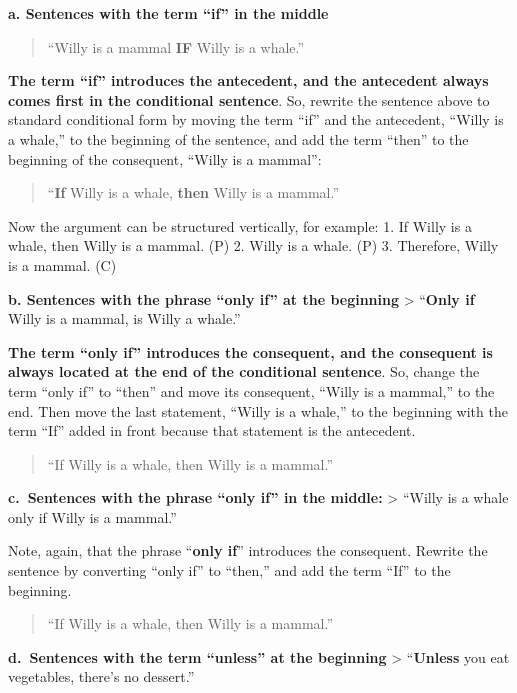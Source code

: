 \documentclass[
]{book}
\begin{document}
\begin{reflect}
\textbf{a. Sentences with the term ``if'' in the middle}

\begin{quote}
``Willy is a mammal \textbf{IF} Willy is a whale.''
\end{quote}

\textbf{The term ``if'' introduces the antecedent, and the antecedent always comes first in the conditional sentence}. So, rewrite the sentence above to standard conditional form by moving the term ``if'' and the antecedent, ``Willy is a whale,'' to the beginning of the sentence, and add the term ``then'' to the beginning of the consequent, ``Willy is a mammal'':

\begin{quote}
``\textbf{If} Willy is a whale, \textbf{then} Willy is a mammal.''
\end{quote}

Now the argument can be structured vertically, for example:
1. If Willy is a whale, then Willy is a mammal. (P)
2. Willy is a whale. (P)
3. Therefore, Willy is a mammal. (C)

\textbf{b. Sentences with the phrase ``only if'' at the beginning}
\textgreater{} ``\textbf{Only if} Willy is a mammal, is Willy a whale.''

\textbf{The term ``only if'' introduces the consequent, and the consequent is always located at the end of the conditional sentence}. So, change the term ``only if'' to ``then'' and move its consequent, ``Willy is a mammal,'' to the end. Then move the last statement, ``Willy is a whale,'' to the beginning with the term ``If'' added in front because that statement is the antecedent.

\begin{quote}
``If Willy is a whale, then Willy is a mammal.''
\end{quote}

\textbf{c.~Sentences with the phrase ``only if'' in the middle:}
\textgreater{} ``Willy is a whale only if Willy is a mammal.''

Note, again, that the phrase ``\textbf{only if}'' introduces the consequent. Rewrite the sentence by converting ``only if'' to ``then,'' and add the term ``If'' to the beginning.

\begin{quote}
``If Willy is a whale, then Willy is a mammal.''
\end{quote}

\textbf{d.~Sentences with the term ``unless'' at the beginning}
\textgreater{} ``\textbf{Unless} you eat vegetables, there's no dessert.''


\end{reflect}
\end{document}
